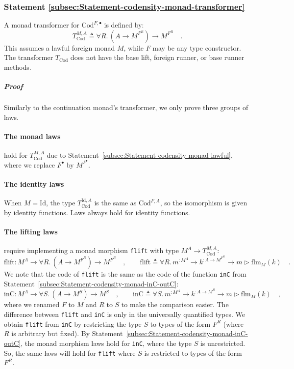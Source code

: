 \subsubsection{Statement \label{subsec:Statement-codensity-monad-transformer}\ref{subsec:Statement-codensity-monad-transformer}}

A monad transformer for $\text{Cod}^{F,\bullet}$ is defined by:
\[
T_{\text{Cod}}^{M,A}\triangleq\forall R.\,(A\rightarrow M^{F^{R}})\rightarrow M^{F^{R}}\quad.
\]
This assumes a lawful foreign monad $M$, while $F$ may be any type
constructor. The transformer $T_{\text{Cod}}$ does not have the base
lift, foreign runner, or base runner methods.

\subparagraph{Proof }

Similarly to the continuation monad\textsf{'}s transformer, we only prove three
groups of laws.

\paragraph{The monad laws}

hold for $T_{\text{Cod}}^{M,A}$ due to Statement~\ref{subsec:Statement-codensity-monad-lawful},
where we replace $F^{\bullet}$ by $M^{F^{\bullet}}$.

\paragraph{The identity laws}

When $M=\text{Id}$, the type $T_{\text{Cod}}^{\text{Id},A}$ is the
same as $\text{Cod}^{F,A}$, so the isomorphism is given by identity
functions. Laws always hold for identity functions.

\paragraph{The lifting laws}

require implementing a monad morphism \lstinline!flift! with type
$M^{A}\rightarrow T_{\text{Cod}}^{M,A}$:
\[
\text{flift}:M^{A}\rightarrow\forall R.\,(A\rightarrow M^{F^{R}})\rightarrow M^{F^{R}}\quad,\quad\quad\text{flift}\triangleq\forall R.\,m^{:M^{A}}\rightarrow k^{:A\rightarrow M^{F^{R}}}\rightarrow m\triangleright\text{flm}_{M}(k)\quad.
\]
We note that the code of \lstinline!flift! is the same as the code
of the function \lstinline!inC! from Statement~\ref{subsec:Statement-codensity-monad-inC-outC}:
\[
\text{inC}:M^{A}\rightarrow\forall S.\,(A\rightarrow M^{S})\rightarrow M^{S}\quad,\quad\quad\text{inC}\triangleq\forall S.\,m^{:M^{A}}\rightarrow k^{:A\rightarrow M^{S}}\rightarrow m\triangleright\text{flm}_{M}(k)\quad,
\]
where we renamed $F$ to $M$ and $R$ to $S$ to make the comparison
easier. The difference between \lstinline!flift! and \lstinline!inC!
is only in the universally quantified types. We obtain \lstinline!flift!
from \lstinline!inC! by restricting the type $S$ to types of the
form $F^{R}$ (where $R$ is arbitrary but fixed). By Statement~\ref{subsec:Statement-codensity-monad-inC-outC},
the monad morphism laws hold for \lstinline!inC!, where the type
$S$ is unrestricted. So, the same laws will hold for \lstinline!flift!
where $S$ is restricted to types of the form $F^{R}$.

